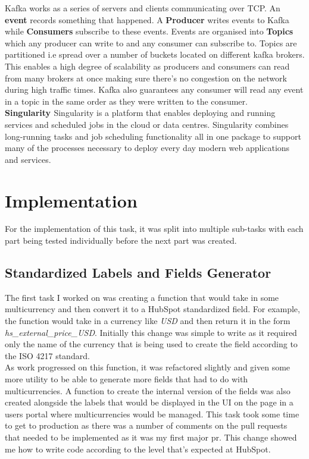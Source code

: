 Kafka works as a series of servers and clients communicating over TCP. An \textbf{event} records something that happened. A \textbf{Producer} writes events to Kafka while \textbf{Consumers} subscribe to these events. \newline Events are organised into \textbf{Topics} which any producer can write to and any consumer can subscribe to. Topics are partitioned i.e spread over a number of buckets located on different kafka brokers. This enables a high degree of scalability as producers and consumers can read from many brokers at once making sure there's no congestion on the network during high traffic times. Kafka also guarantees any consumer will read any event in a topic in the same order as they were written to the consumer. \newline \\

\textbf{Singularity \cite{sing-docs}}
Singularity is a platform that enables deploying and running services and scheduled jobs in the cloud or data centres. Singularity combines long-running tasks and job scheduling functionality all in one package to support many of the processes necessary to deploy every day modern web applications and services.  

\section{Implementation}
For the implementation of this task, it was split into multiple sub-tasks with each part being tested individually before the next part was created.
\subsection{Standardized Labels and Fields Generator}

The first task I worked on was creating a function that would take in some multicurrency and then convert it to a HubSpot standardized field. \newline For example,  the function would take in a currency like \textit{USD} and then return it in the form \textit{hs\_external\_price\_USD}.  \newline Initially this change was simple to write as it required only the name of the currency that is being used to create the field according to the ISO 4217 standard.  \newline \\ As work progressed on this function,  it was refactored slightly and given some more utility to be able to generate more fields that had to do with multicurrencies.  A function to create the internal version of the fields was also created alongside the labels that would be displayed in the UI on the page in a users portal where multicurrencies would be managed.  \newline This task took some time to get to production as there was a number of comments on the pull requests that needed to be implemented as it was my first major pr.  This change showed me how to write code according to the level that's expected at HubSpot.

